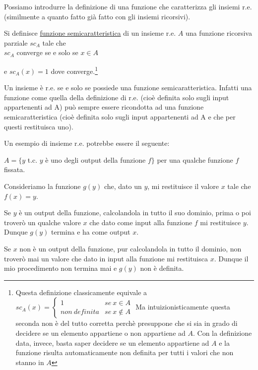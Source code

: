 Possiamo introdurre la definizione di una funzione che caratterizza gli insiemi r.e. (similmente a quanto fatto gi\`a fatto con gli insiemi ricorsivi).

\begin{defi}
Si definisce \underline{funzione semicaratteristica} di un insieme r.e. $A$ una funzione ricorsiva
parziale $sc_A$ tale che\\

$sc_A$ converge se e solo se $x \in A$

e $sc_A(x)=1$ dove converge.\footnote{Questa definizione classicamente equivale a 
$sc_A(x)=\left\{ \begin{array}{cc}
1 & se\ x\in A\\
non\ definita & se\ x\notin A\end{array}\right.$
Ma intuizionisticamente questa seconda non \`e del tutto corretta perch\`e presuppone che si sia in grado di decidere se un elemento appartiene o non appartiene ad $A$. Con la definizione data, invece, basta saper decidere se un elemento appartiene ad $A$ e la funzione risulta automaticamente non definita per tutti i valori che non stanno in $A$}

\end{defi}

Un insieme \`e r.e. se e solo se possiede una funzione semicaratteristica. Infatti una funzione come quella della definizione di r.e. (cio\`e definita solo sugli input appartenenti ad A) pu\`o sempre essere ricondotta ad una funzione semicaratteristica (cio\`e definita solo sugli input appartenenti ad A e che per questi restituisca uno).

Un esempio di insieme r.e. potrebbe essere il seguente:

$A=\{y$ t.c. $y$ \`e uno degli output della funzione $f\}$ per una qualche funzione $f$ fissata.

Consideriamo la funzione $g(y)$ che, dato un $y$, mi restituisce il valore $x$ tale che $f(x)=y$. 

Se $y$ \`e un output della funzione, calcolandola in tutto il suo dominio, prima o poi trover\`o un qualche valore $x$ che dato come input alla funzione $f$ mi restituisce $y$. Dunque $g(y)$ termina e ha come output $x$.

Se $x$ non \`e un output della funzione, pur calcolandola in tutto il dominio, non trover\`o mai un valore che dato in input alla funzione mi restituisca $x$. Dunque il mio procedimento non termina mai e $g(y)$ non \`e definita.

